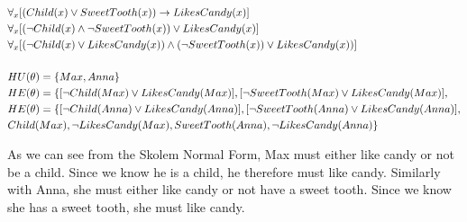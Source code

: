 \documentclass[11pt, letterpaper]{exam}
\begin{document}
\begin{questions}
\begin{parts}
    \end{parts}

    \vspace{1em}

    \question
    \begin{align*}
      &\forall_x[(Child(x) \lor SweetTooth(x)) \to LikesCandy(x)] \\
      &\forall_x[(\neg Child(x) \land \neg SweetTooth(x)) \lor LikesCandy(x)] \\
      &\forall_x[(\neg Child(x) \lor LikesCandy(x)) \land (\neg SweetTooth(x)) \lor LikesCandy(x))] \\\\
      &HU(\theta \*) = \{Max, Anna\} \\
      &HE(\theta \*) = \{[\neg Child(Max) \lor LikesCandy(Max)], [\neg SweetTooth(Max) \lor LikesCandy(Max)], \\
      &HE(\theta \*) = \{[\neg Child(Anna) \lor LikesCandy(Anna)], [\neg SweetTooth(Anna) \lor LikesCandy(Anna)], \\
      & Child(Max), \neg LikesCandy(Max), SweetTooth(Anna), \neg LikesCandy(Anna)
      \}
    \end{align*}

    As we can see from the Skolem Normal Form, Max must either like candy or not be a child. Since we know he is a child,
    he therefore must like candy. Similarly with Anna, she must either like candy or not have a sweet tooth. Since we know
    she has a sweet tooth, she must like candy.


  \end{questions}
\end{document}
